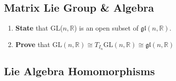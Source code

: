 \documentclass[prb,12pt]{revtex4-2}
\theoremstyle{definition}
\theoremstyle{definition}
\newcommand{\R}{\mathbb{R}}
\begin{document}
\subsection{Matrix Lie Group \& Algebra}
\begin{enumerate}[resume]
	\item \textbf{State} that GL($n, \R$) is an open subset of $\mathfrak{gl}(n, \R)$.
	\item \textbf{Prove} that $\text{GL}(n, \R)\cong T_{I_n}\text{GL}(n, \R)\cong \mathfrak{gl}(n, \R)$
\end{enumerate}
\subsection{Lie Algebra Homomorphisms}
\end{document}

